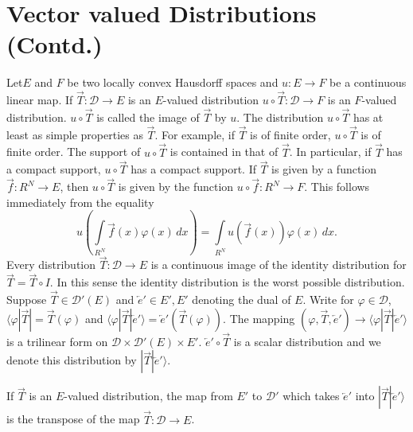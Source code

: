 
\chapter{Vector valued Distributions (Contd.)}\label{chap2}

Let\pageoriginale $E$ and $F$ be two locally convex Hausdorff spaces
and $u:E \to F$ be a continuous linear map. If
$\overrightarrow{T}:\mathscr{D} \to E$ is an $E$-valued distribution
$u \circ \overrightarrow{T}:\mathscr{D} \to F$ is an $F$-valued
distribution. $u \circ \overrightarrow{T}$ is called the image of
$\overrightarrow{T}$ by $u$. The distribution $u\circ
\overrightarrow{T}$ has at least as simple properties as
$\overrightarrow{T}$. For example, if $\overrightarrow{T}$ is of
finite order, $u \circ \overrightarrow{T}$ is of finite order. The
support of $u\circ \overrightarrow{T}$ is contained in that of
$\overrightarrow{T}$. In particular, if $\overrightarrow{T}$ has a
compact support, $u\circ \overrightarrow{T}$ has a compact support. If
$\overrightarrow{T}$ is given by a function
$\overrightarrow{f}:R^N\to E$, then $u\circ \overrightarrow{T}$ is
given by the function $u\circ \overrightarrow{f}:R^N\to F$. This
follows immediately from the equality
$$
u\left(\int\limits_{R^N}\overrightarrow{f}(x) \varphi(x)\,dx\right) =
\int\limits_{R^N} u(\overrightarrow{f}(x)) \varphi(x)\,dx.
$$
Every distribution $\overrightarrow{T}:\mathscr{D} \to E$ is a
continuous image of the identity distribution for $\overrightarrow{T}
= \overrightarrow{T} \circ I$. In this sense the identity distribution
is the worst possible distribution. Suppose $\overrightarrow{T} \in
\mathscr{D}' (E)$ and $\overleftarrow{e}' \in E', E'$ denoting the
dual of $E$. Write for $\varphi\in\mathscr{D}$, $\langle\varphi
|\overrightarrow{T}|=\overrightarrow{T}(\varphi)$ and $\langle
\varphi |\overrightarrow{T}| \overleftarrow{e}'\rangle =
\overleftarrow{e}' (\overrightarrow{T} (\varphi))$. The mapping
$(\varphi,\overrightarrow{T},\overleftarrow{e}')\to \langle \varphi
|\overrightarrow{T}| \overleftarrow{e}'\rangle$ is a trilinear form
on $\mathscr{D}\times\mathscr{D}'(E)\times E'$. $\overleftarrow{e}' \circ
\overrightarrow{T}$ is a scalar distribution and we denote this
distribution by $|\overrightarrow{T}| \overleftarrow{e}'\rangle$.

\setcounter{section}{2}
\begin{prop}\label{chap2:prop2.1}
If $\overrightarrow{T}$ is an $E$-valued distribution, the map from
$E'$ to $\mathscr{D'}$ which takes $\overleftarrow{e}'$ into
$|\overrightarrow{T}|\overleftarrow{e}'\rangle$ is the transpose of
the map $\overrightarrow{T}:\mathscr{D}\to E$.
\end{prop}

